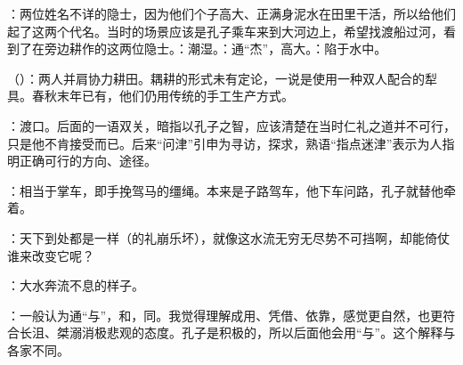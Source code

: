 {
\item {}：两位姓名不详的隐士，因为他们个子高大、正满身泥水在田里干活，所以给他们起了这两个代名。当时的场景应该是孔子乘车来到大河边上，希望找渡船过河，看到了在旁边耕作的这两位隐士。：潮湿。：通“杰”，高大。：陷于水中。

\item {}（）：两人并肩协力耕田。耦耕的形式未有定论，一说是使用一种双人配合的犁具。春秋末年已有，他们仍用传统的手工生产方式。

\item {}：渡口。后面的一语双关，暗指以孔子之智，应该清楚在当时仁礼之道并不可行，只是他不肯接受而已。后来“问津”引申为寻访，探求，熟语“指点迷津”表示为人指明正确可行的方向、途径。

\item {}：相当于掌车，即手挽驾马的缰绳。本来是子路驾车，他下车问路，孔子就替他牵着。

\item {}：天下到处都是一样（的礼崩乐坏），就像这水流无穷无尽势不可挡啊，却能倚仗谁来改变它呢？

：大水奔流不息的样子。

：一般认为通“与”，和，同。我觉得理解成用、凭借、依靠，感觉更自然，也更符合长沮、桀溺消极悲观的态度。孔子是积极的，所以后面他会用“与”。这个解释与各家不同。

}
